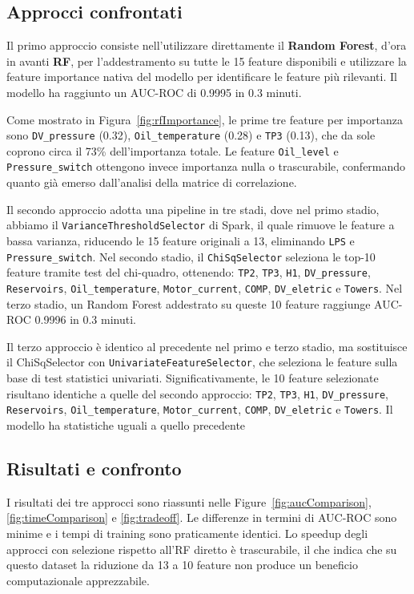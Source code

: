 \documentclass[../main.tex]{subfiles}
\begin{document}
\subsection{Approcci confrontati}

Il primo approccio consiste nell'utilizzare direttamente il \textbf{Random Forest}, d'ora in avanti \textbf{RF}, per l'addestramento su tutte le 15 feature disponibili e utilizzare la feature importance nativa del modello per identificare le feature più rilevanti. Il modello ha raggiunto un AUC-ROC di 0.9995 in 0.3 minuti.

Come mostrato in Figura~\ref{fig:rfImportance}, le prime tre feature per 
importanza sono \texttt{DV\_pressure} (0.32), \texttt{Oil\_temperature} (0.28) 
e \texttt{TP3} (0.13), che da sole coprono circa il 73\% dell'importanza 
totale. Le feature \texttt{Oil\_level} e 
\texttt{Pressure\_switch} ottengono invece importanza nulla o trascurabile, 
confermando quanto già emerso dall'analisi della matrice di correlazione.

Il secondo approccio adotta una pipeline in tre stadi, dove nel primo stadio, abbiamo il \texttt{VarianceThresholdSelector} di Spark, il quale rimuove le 
feature a bassa varianza, riducendo le 15 feature originali a 13, eliminando 
\texttt{LPS} e \texttt{Pressure\_switch}. 
Nel secondo stadio, il \texttt{ChiSqSelector} seleziona le top-10 feature tramite test del chi-quadro, ottenendo: \texttt{TP2}, \texttt{TP3}, \texttt{H1}, \texttt{DV\_pressure}, \texttt{Reservoirs}, \texttt{Oil\_temperature}, \texttt{Motor\_current}, \texttt{COMP}, \texttt{DV\_eletric} e \texttt{Towers}. 
Nel terzo stadio, un Random Forest addestrato su queste 10 feature raggiunge AUC-ROC 0.9996 in 0.3 minuti.

Il terzo approccio è identico al precedente nel primo e terzo stadio, ma sostituisce il ChiSqSelector con \texttt{UnivariateFeatureSelector}, che seleziona le feature sulla base di test statistici univariati. Significativamente, le 10 feature selezionate risultano identiche a quelle del secondo approccio: \texttt{TP2}, \texttt{TP3}, \texttt{H1}, \texttt{DV\_pressure}, \texttt{Reservoirs}, \texttt{Oil\_temperature}, \texttt{Motor\_current}, \texttt{COMP}, \texttt{DV\_eletric} e \texttt{Towers}. Il modello ha statistiche uguali a quello precedente

\newpage
\subsection{Risultati e confronto}
I risultati dei tre approcci sono riassunti nelle Figure~\ref{fig:aucComparison}, 
\ref{fig:timeComparison} e \ref{fig:tradeoff}. Le differenze in termini di 
AUC-ROC sono minime e i tempi di training sono praticamente identici. Lo speedup degli approcci con selezione rispetto all'RF diretto è trascurabile, il che indica che su questo dataset la riduzione da 13 a 10 feature non produce un beneficio computazionale apprezzabile.
\end{document}
